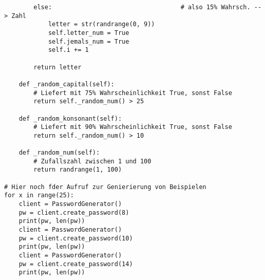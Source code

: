\documentclass[a4paper,10pt,ngerman]{scrartcl}
\begin{document}
\begin{lstlisting}
        else:                                   # also 15% Wahrsch. --> Zahl
            letter = str(randrange(0, 9))
            self.letter_num = True
            self.jemals_num = True
            self.i += 1

        return letter

    def _random_capital(self):
        # Liefert mit 75% Wahrscheinlichkeit True, sonst False
        return self._random_num() > 25

    def _random_konsonant(self):
        # Liefert mit 90% Wahrscheinlichkeit True, sonst False
        return self._random_num() > 10

    def _random_num(self):
        # Zufallszahl zwischen 1 und 100
        return randrange(1, 100)

# Hier noch fder Aufruf zur Genierierung von Beispielen 
for x in range(25):
    client = PasswordGenerator()
    pw = client.create_password(8)
    print(pw, len(pw))
    client = PasswordGenerator()
    pw = client.create_password(10)
    print(pw, len(pw))
    client = PasswordGenerator()
    pw = client.create_password(14)
    print(pw, len(pw))
\end{lstlisting}
\end{document}
